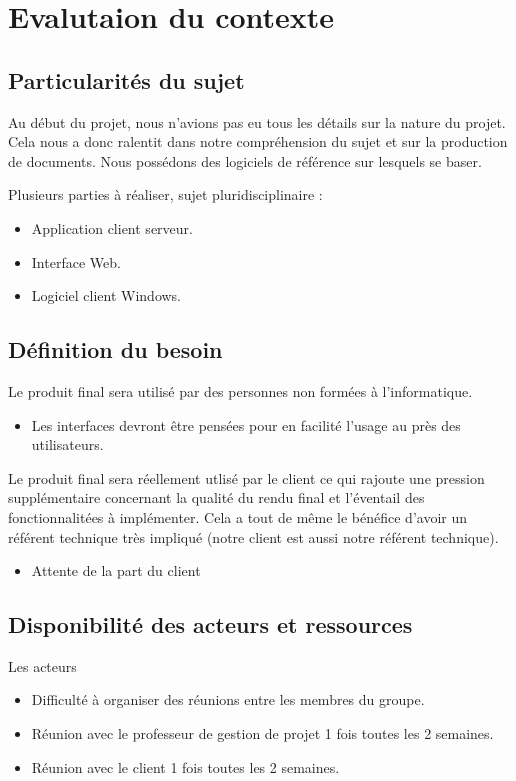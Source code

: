 \chapter{Evalutaion du contexte}

\section{Particularités du sujet}
Au début du projet, nous n'avions pas eu tous les détails sur la nature du projet. Cela nous a donc ralentit
dans notre compréhension du sujet et sur la production de documents.
Nous possédons des logiciels de référence sur lesquels se baser.\\ \newline

Plusieurs parties à réaliser, sujet pluridisciplinaire :
\begin{itemize}
	\item Application client serveur.
	\item Interface Web.
	\item Logiciel client Windows.
\end{itemize}

\section{Définition du besoin}
Le produit final sera utilisé par des personnes non formées à l'informatique. 
\begin{itemize}	
	\item Les interfaces devront être pensées pour en facilité l'usage au près des utilisateurs.\newline
\end{itemize}

Le produit final sera réellement utlisé par le client ce qui rajoute une pression supplémentaire concernant la qualité du rendu final et l'éventail des fonctionnalitées à implémenter. Cela a tout de même le bénéfice d'avoir un référent technique très impliqué (notre client est aussi notre référent technique).
\begin{itemize}
	\item Attente de la part du client
\end{itemize}

\section{Disponibilité des acteurs et ressources}
Les acteurs
\begin{itemize}
	\item Difficulté à organiser des réunions entre les membres du groupe.
	\item Réunion avec le professeur de gestion de projet 1 fois toutes les 2 semaines. 
	\item Réunion avec le client 1 fois toutes les 2 semaines.\newline
\end{itemize}

